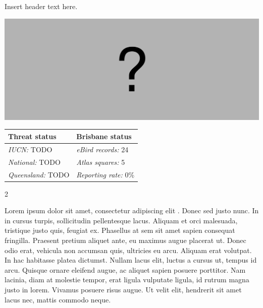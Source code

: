 \documentclass[12pt,openany,oneside]{book}
\let\origfigure\figure
\let\endorigfigure\endfigure
\renewenvironment{figure}[1][2] {
  \expandafter\origfigure\expandafter[H]
} {
  \endorigfigure
}
\let\Begin\begin
\let\End\end
\theoremstyle{definition}
\theoremstyle{definition}
\theoremstyle{definition}
\theoremstyle{remark}
\begin{document}

Insert header text here.

\begin{figure}
\centering
\includegraphics[width=\textwidth,keepaspectratio=true]{assets/misc/missing-profile.png}
\caption{Insert caption here.}
\end{figure}

\begin{tabu} to 
\toprule
Threat status & Brisbane status\\
\midrule
\textit{IUCN:} TODO & \textit{eBird records:} 24\\
\textit{National:} TODO & \textit{Atlas squares:} 5\\
\textit{Queensland:} TODO & \textit{Reporting rate:} 0\%\\
\bottomrule
\end{tabu} 
\vspace{0.15cm}

\Begin{multicols}{2}

Lorem ipsum dolor sit amet, consectetur adipiscing elit
\citep{rexample1, rexample2, rexample3}. Donec sed justo nunc. In in
cursus turpis, sollicitudin pellentesque lacus. Aliquam et orci
malesuada, tristique justo quis, feugiat ex. Phasellus at sem sit amet
sapien consequat fringilla. Praesent pretium aliquet ante, eu maximus
augue placerat ut. Donec odio erat, vehicula non accumsan quis,
ultricies eu arcu. Aliquam erat volutpat. In hac habitasse platea
dictumst. Nullam lacus elit, luctus a cursus ut, tempus id arcu. Quisque
ornare eleifend augue, ac aliquet sapien posuere porttitor. Nam lacinia,
diam at molestie tempor, erat ligula vulputate ligula, id rutrum magna
justo in lorem. Vivamus posuere risus augue. Ut velit elit, hendrerit
sit amet lacus nec, mattis commodo neque.

\End{multicols}

\clearpage
\end{document}
